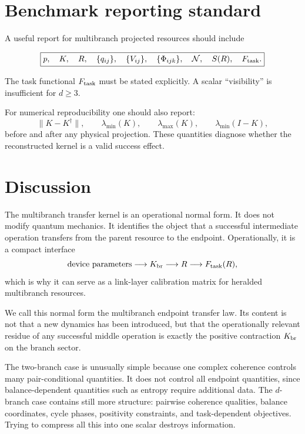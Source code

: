 \documentclass[reprint,aps,pra,superscriptaddress,nofootinbib,longbibliography]{revtex4-2}
\newcommand{\N}{\mathcal N}
\begin{document}
\section{Benchmark reporting standard}
\label{sec:reporting}

A useful report for multibranch projected resources should include
\begin{widetext}
\[
\boxed{
p,\quad K,\quad R,\quad
\{q_{ij}\},\quad \{V_{ij}\},\quad \{\Phi_{ijk}\},\quad
\N,\quad S(R),\quad F_{\rm task}.
}
\]
\end{widetext}
The task functional \(F_{\rm task}\) must be stated explicitly.  A scalar ``visibility'' is insufficient for \(d\ge3\).

For numerical reproducibility one should also report:
\[
\|K-K^\dagger\|,
\qquad
\lambda_{\min}(K),
\qquad
\lambda_{\max}(K),
\qquad
\lambda_{\min}(I-K),
\]
before and after any physical projection.  These quantities diagnose whether the reconstructed kernel is a valid success effect.

\section{Discussion}

The multibranch transfer kernel is an operational normal form.  It does not modify quantum mechanics.  It identifies the object that a successful intermediate operation transfers from the parent resource to the endpoint.  Operationally, it is a compact interface
\[
\text{device parameters}\longrightarrow K_{\rm br}\longrightarrow R\longrightarrow F_{\rm task}(R),
\]
which is why it can serve as a link-layer calibration matrix for heralded multibranch resources.

We call this normal form the multibranch endpoint transfer law.  Its content is not that a new dynamics has been introduced, but that the operationally relevant residue of any successful middle operation is exactly the positive contraction \(K_{\rm br}\) on the branch sector.

The two-branch case is unusually simple because one complex coherence controls many pair-conditional quantities.  It does not control all endpoint quantities, since balance-dependent quantities such as entropy require additional data.  The \(d\)-branch case contains still more structure: pairwise coherence qualities, balance coordinates, cycle phases, positivity constraints, and task-dependent objectives.  Trying to compress all this into one scalar destroys information.
\end{document}
